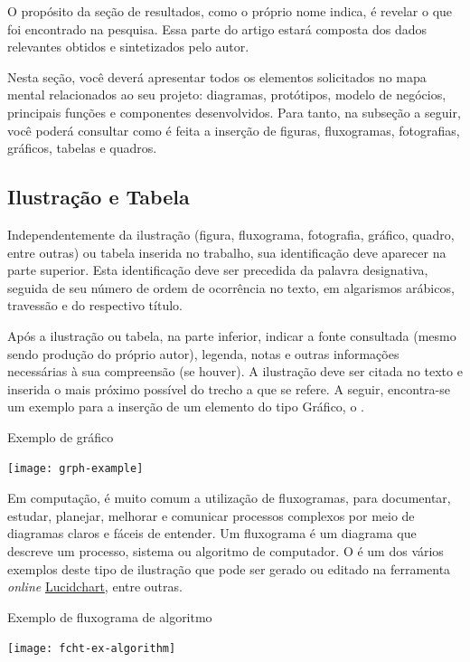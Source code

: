 O propósito da seção de resultados, como o próprio nome indica, é revelar o que foi encontrado na pesquisa. Essa parte do artigo estará composta dos dados relevantes obtidos e sintetizados pelo autor. 

Nesta seção, você deverá apresentar todos os elementos solicitados no mapa mental relacionados ao seu projeto: diagramas, protótipos, modelo de negócios, principais funções e componentes desenvolvidos. Para tanto, na subseção a seguir, você poderá consultar como é feita a inserção de figuras, fluxogramas, fotografias, gráficos, tabelas e quadros.

\subsection*{Ilustração e Tabela}

Independentemente da ilustração (figura, fluxograma, fotografia, gráfico, quadro, entre outras) ou tabela inserida no trabalho, sua identificação deve aparecer na parte superior. Esta identificação deve ser precedida da palavra designativa, seguida de seu número de ordem de ocorrência no texto, em algarismos arábicos, travessão e do respectivo título.

Após a ilustração ou tabela, na parte inferior, indicar a fonte consultada (mesmo sendo produção do próprio autor), legenda, notas e outras informações necessárias à sua compreensão (se houver). A ilustração deve ser citada no texto e inserida o mais próximo possível do trecho a que se refere. A seguir, encontra-se um exemplo para a inserção de um elemento do tipo Gráfico, o .

\begin{graph}[!h]
\centering
{}
\caption{Exemplo de gráfico}%
\label{grph:example}
\texttt{[image: grph-example]}
\end{graph}

Em computação, é muito comum a utilização de fluxogramas, para documentar, estudar, planejar, melhorar e comunicar processos complexos por meio de diagramas claros e fáceis de entender. Um fluxograma é um diagrama que descreve um processo, sistema ou algoritmo de computador. O  é um dos vários exemplos deste tipo de ilustração que pode ser gerado ou editado na ferramenta \textit{online} \href{http://www.lucidchart.com/}{Lucidchart}, entre outras.

\begin{flowchart}[!htb]
\centering
\caption{Exemplo de fluxograma de algoritmo}%
\label{fcht:ex-algorithm}
\texttt{[image: fcht-ex-algorithm]}
\end{flowchart}


